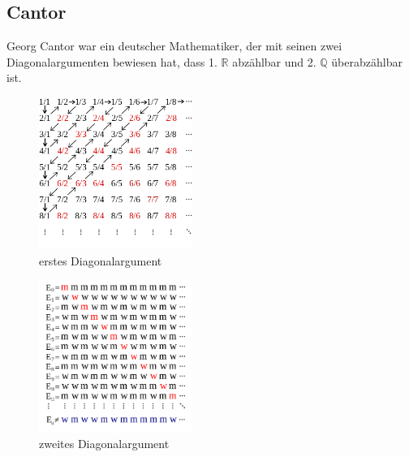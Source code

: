 \documentclass{article}
\begin{document}
\subsection{Cantor}
Georg Cantor war ein deutscher Mathematiker, der mit seinen zwei Diagonalargumenten bewiesen hat, dass 1. \( \mathbb{R}\) abzählbar und 2. \( \mathbb{Q}\) überabzählbar ist.
\begin{center}
\begin{figure}[h]
		\begin{center}
		\includegraphics[width=5cm]{img/cantor1.png}
		\caption{erstes Diagonalargument}
		\label{fig:erstes Diagonalargument}
		\end{center}
\end{figure}
\end{center}
\begin{center}
\begin{figure}[h]
		\begin{center}
		\includegraphics[width=5cm]{img/cantor.png}
		\caption{zweites Diagonalargument}
		\label{fig:zweites Diagonalargument}
		\end{center}
\end{figure}
\end{center}
\end{document}
